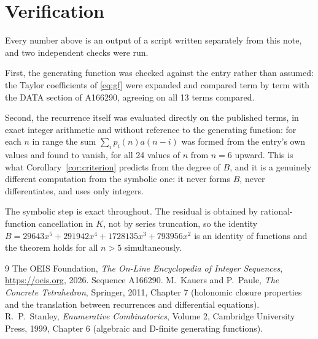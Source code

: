 \documentclass[11pt,a4paper]{article}
\theoremstyle{plain}
\theoremstyle{definition}
\begin{document}
\section{Verification}

Every number above is an output of a script written separately from this note, and two
independent checks were run.

First, the generating function was checked against the entry rather than assumed: the
Taylor coefficients of \eqref{eq:gf} were expanded and compared term by term with the DATA
section of A166290, agreeing on all 13 terms compared.

Second, the recurrence itself was evaluated directly on the published terms, in exact
integer arithmetic and without reference to the generating function: for each $n$ in range
the sum $\sum_{i}p_{i}(n)a(n-i)$ was formed from the entry's own values and found to
vanish, for all 24 values of $n$ from $n=6$ upward. This is what
Corollary~\ref{cor:criterion} predicts from the degree of $B$, and it is a genuinely
different computation from the symbolic one: it never forms $B$, never differentiates, and
uses only integers.

The symbolic step is exact throughout. The residual is obtained by rational-function
cancellation in $K$, not by series truncation, so the identity $B=29643 x^{5} + 291942 x^{4} + 1728135 x^{3} + 793956 x^{2}$ is an
identity of functions and the theorem holds for all $n>5$ simultaneously.

\begin{thebibliography}{9}
 The OEIS Foundation, \emph{The On-Line Encyclopedia of Integer Sequences},
\url{https://oeis.org}, 2026. Sequence A166290.
 M.~Kauers and P.~Paule, \emph{The Concrete Tetrahedron}, Springer, 2011,
Chapter 7 (holonomic closure properties and the translation between recurrences and
differential equations).
 R.~P.~Stanley, \emph{Enumerative Combinatorics}, Volume 2, Cambridge
University Press, 1999, Chapter 6 (algebraic and D-finite generating functions).
\end{thebibliography}
\end{document}
